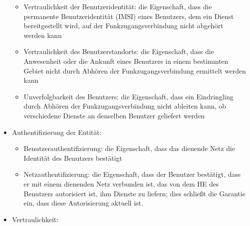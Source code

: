 \documentclass[a4paper]{article}
\begin{document}
\begin{multicols}{3}
\begin{itemize}
              \begin{itemize}
                  \item
                        Vertraulichkeit der Benutzeridentität: die Eigenschaft, dass die
                        permanente Benutzeridentität (IMSI) eines Benutzers, dem ein Dienst
                        bereitgestellt wird, auf der Funkzugangsverbindung nicht abgehört
                        werden kann
                  \item
                        Vertraulichkeit des Benutzerstandorts: die Eigenschaft, dass die
                        Anwesenheit oder die Ankunft eines Benutzers in einem bestimmten
                        Gebiet nicht durch Abhören der Funkzugangsverbindung ermittelt
                        werden kann
                  \item
                        Unverfolgbarkeit des Benutzers: die Eigenschaft, dass ein
                        Eindringling durch Abhören der Funkzugangsverbindung nicht ableiten
                        kann, ob verschiedene Dienste an denselben Benutzer geliefert werden
              \end{itemize}
        \item
              Authentifizierung der Entität:

              \begin{itemize}
                  \item
                        Benutzerauthentifizierung: die Eigenschaft, dass das dienende Netz
                        die Identität des Benutzers bestätigt
                  \item
                        Netzauthentifizierung: die Eigenschaft, dass der Benutzer bestätigt,
                        dass er mit einem dienenden Netz verbunden ist, das von dem HE des
                        Benutzers autorisiert ist, ihm Dienste zu liefern; dies schließt die
                        Garantie ein, dass diese Autorisierung aktuell ist.
              \end{itemize}
        \item
              Vertraulichkeit:


\end{itemize}
\end{multicols}
\end{document}

